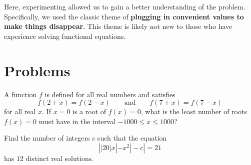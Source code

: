 \documentclass{article}
\begin{document}
\bigskip

Here, experimenting allowed us to gain a better understanding of the problem. Specifically, we used the classic theme of \textbf{plugging in convenient values to make things disappear}. This theme is likely not new to those who have experience solving functional equations.

\pagebreak\section{Problems}


\begin{prob}[AIME 1984/12]{4}
A function $f$ is defined for all real numbers and satisfies\[f(2 + x) = f(2 - x)\qquad\text{and}\qquad f(7 + x) = f(7 - x)\]for all real $x$. If $x = 0$ is a root of $f(x) = 0$, what is the least number of roots $f(x) = 0$ must have in the interval $-1000 \le x \le 1000$?
\end{prob}

\begin{prob}[AIME I 2021/8]{6}
Find the number of integers $c$ such that the equation$$\left||20|x|-x^2|-c\right|=21$$has $12$ distinct real solutions.
\end{prob}
\end{document}
